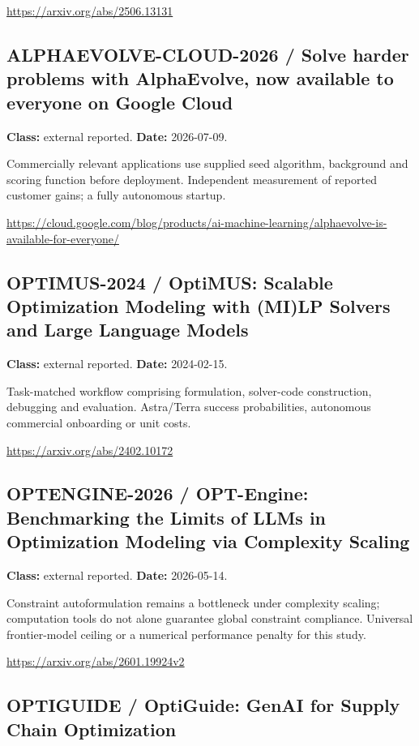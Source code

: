 \documentclass[10pt]{article}
\begin{document}
\url{https://arxiv.org/abs/2506.13131}

\subsection*{ALPHAEVOLVE-CLOUD-2026 / Solve harder problems with AlphaEvolve, now available to everyone on Google Cloud}

\textbf{Class:} external reported. \textbf{Date:} 2026-07-09.

Commercially relevant applications use supplied seed algorithm, background and scoring function before deployment. Independent measurement of reported customer gains; a fully autonomous startup.

\url{https://cloud.google.com/blog/products/ai-machine-learning/alphaevolve-is-available-for-everyone/}

\subsection*{OPTIMUS-2024 / OptiMUS: Scalable Optimization Modeling with (MI)LP Solvers and Large Language Models}

\textbf{Class:} external reported. \textbf{Date:} 2024-02-15.

Task-matched workflow comprising formulation, solver-code construction, debugging and evaluation. Astra/Terra success probabilities, autonomous commercial onboarding or unit costs.

\url{https://arxiv.org/abs/2402.10172}

\subsection*{OPTENGINE-2026 / OPT-Engine: Benchmarking the Limits of LLMs in Optimization Modeling via Complexity Scaling}

\textbf{Class:} external reported. \textbf{Date:} 2026-05-14.

Constraint autoformulation remains a bottleneck under complexity scaling; computation tools do not alone guarantee global constraint compliance. Universal frontier-model ceiling or a numerical performance penalty for this study.

\url{https://arxiv.org/abs/2601.19924v2}

\subsection*{OPTIGUIDE / OptiGuide: GenAI for Supply Chain Optimization}
\end{document}

